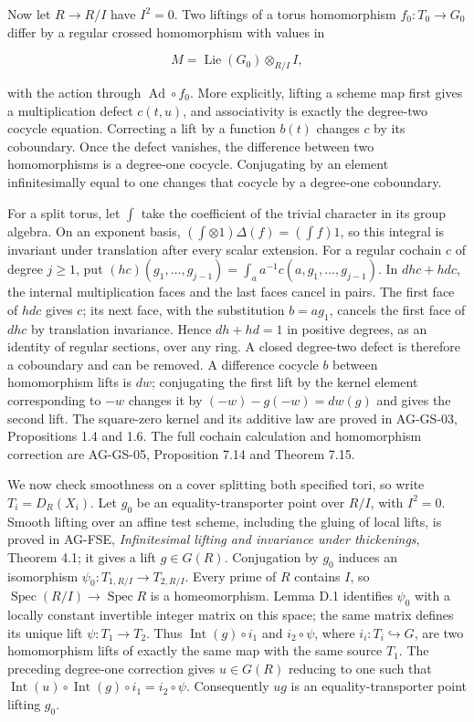 \documentclass[11pt,a4paper,openany]{report}
\begin{document}
Now let \(R\to R/I\) have \(I^2=0\). Two liftings of a torus homomorphism \(f_0:T_0\to G_0\) differ by a regular crossed homomorphism with values in

\[
M=\operatorname{Lie}(G_0)\otimes_{R/I}I,
\]

with the action through \(\operatorname{Ad}\circ f_0\). More explicitly, lifting a scheme map first gives a multiplication defect \(c(t,u)\), and associativity is exactly the degree-two cocycle equation. Correcting a lift by a function \(b(t)\) changes \(c\) by its coboundary. Once the defect vanishes, the difference between two homomorphisms is a degree-one cocycle. Conjugating by an element infinitesimally equal to one changes that cocycle by a degree-one coboundary.

For a split torus, let \(\int\) take the coefficient of the trivial character in its group algebra. On an exponent basis, \((\int\otimes1)\Delta(f)=(\int f)1\), so this integral is invariant under translation after every scalar extension. For a regular cochain \(c\) of degree \(j\geq1\), put \((hc)(g_1,\ldots,g_{j-1})=\int_a a^{-1}c(a,g_1,\ldots,g_{j-1})\). In \(dhc+hdc\), the internal multiplication faces and the last faces cancel in pairs. The first face of \(hdc\) gives \(c\); its next face, with the substitution \(b=ag_1\), cancels the first face of \(dhc\) by translation invariance. Hence \(dh+hd=1\) in positive degrees, as an identity of regular sections, over any ring. A closed degree-two defect is therefore a coboundary and can be removed. A difference cocycle \(b\) between homomorphism lifts is \(dw\); conjugating the first lift by the kernel element corresponding to \(-w\) changes it by \((-w)-g(-w)=dw(g)\) and gives the second lift. The square-zero kernel and its additive law are proved in AG-GS-03, Propositions 1.4 and 1.6. The full cochain calculation and homomorphism correction are AG-GS-05, Proposition 7.14 and Theorem 7.15.

We now check smoothness on a cover splitting both specified tori, so write \(T_i=D_R(X_i)\). Let \(g_0\) be an equality-transporter point over \(R/I\), with \(I^2=0\). Smooth lifting over an affine test scheme, including the gluing of local lifts, is proved in AG-FSE, \emph{Infinitesimal lifting and invariance under thickenings}, Theorem 4.1; it gives a lift \(g\in G(R)\). Conjugation by \(g_0\) induces an isomorphism \(\psi_0:T_{1,R/I}\to T_{2,R/I}\). Every prime of \(R\) contains \(I\), so \(\operatorname{Spec}(R/I)\to\operatorname{Spec}R\) is a homeomorphism. Lemma D.1 identifies \(\psi_0\) with a locally constant invertible integer matrix on this space; the same matrix defines its unique lift \(\psi:T_1\to T_2\). Thus \(\operatorname{Int}(g)\circ i_1\) and \(i_2\circ\psi\), where \(i_i:T_i\hookrightarrow G\), are two homomorphism lifts of exactly the same map with the same source \(T_1\). The preceding degree-one correction gives \(u\in G(R)\) reducing to one such that \(\operatorname{Int}(u)\circ\operatorname{Int}(g)\circ i_1=i_2\circ\psi\). Consequently \(ug\) is an equality-transporter point lifting \(g_0\).
\end{document}
